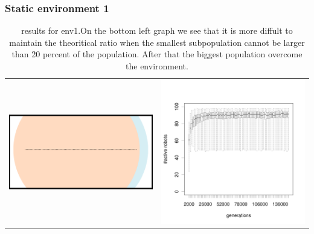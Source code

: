 \documentclass[a4paper,10pt]{article}
\begin{document}
\subsubsection{Static environment 1}
\begin{table}[h!]
 \caption{results for env1.\newline On the bottom left graph we see that it is more diffult to maintain the theoritical ratio when the smallest subpopulation cannot be larger than 20 percent of the population. After that the biggest population overcome the environment. }
 \centering
 \begin{tabular}{cc}
 \includegraphics[width=\imgSize]{images/5StaticEnv/environments/staticEnv1}&\includegraphics[width=\imgSize]{images/5StaticEnv/alive_staticEnv1}\\

\end{tabular}
\end{table}
\end{document}
